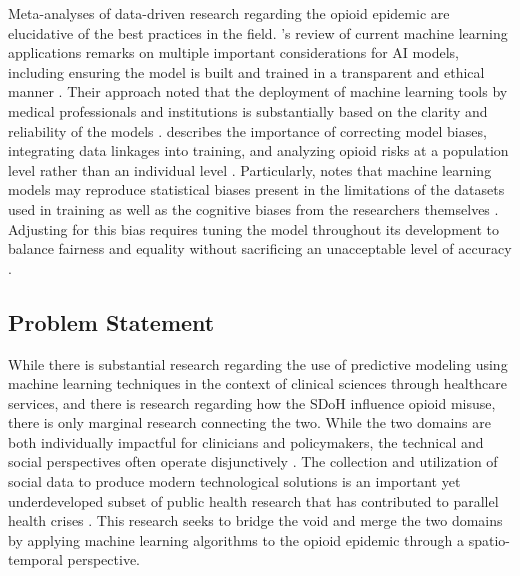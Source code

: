 \documentclass[journal]{IEEEtran}
\begin{document}
	Meta-analyses of data-driven research regarding the opioid epidemic are elucidative of the best practices in the field. \citeauthor{gabrielReviewLeveragingArtificial2025}'s review of current machine learning applications remarks on multiple important considerations for AI models, including ensuring the model is built and trained in a transparent and ethical manner \cite{gabrielReviewLeveragingArtificial2025}. Their approach noted that the deployment of machine learning tools by medical professionals and institutions is substantially based on the clarity and reliability of the models \cite{gabrielReviewLeveragingArtificial2025}. \citeauthor{bharatBigDataPredictive2021} describes the importance of correcting model biases, integrating data linkages into training, and analyzing opioid risks at a population level rather than an individual level  \cite{bharatBigDataPredictive2021}. Particularly, \citeauthor{bharatBigDataPredictive2021} notes that machine learning models may reproduce statistical biases present in the limitations of the datasets used in training as well as the cognitive biases from the researchers themselves \cite{bharatBigDataPredictive2021}. Adjusting for this bias requires tuning the model throughout its development to balance fairness and equality without sacrificing an unacceptable level of accuracy \cite{bharatBigDataPredictive2021}.

	\subsection{Problem Statement}

	While there is substantial research regarding the use of predictive modeling using machine learning techniques in the context of clinical sciences through healthcare services, and there is research regarding how the SDoH influence opioid misuse, there is only marginal research connecting the two. While the two domains are both individually impactful for clinicians and policymakers, the technical and social perspectives often operate disjunctively \cite{blancoAmericasOpioidCrisis2020}. The collection and utilization of social data to produce modern technological solutions is an important yet underdeveloped subset of public health research that has contributed to parallel health crises \cite{bharatBigDataPredictive2021, blancoAmericasOpioidCrisis2020, baduDataDrivenEpidemiologicalApproach2025}. This research seeks to bridge the void and merge the two domains by applying machine learning algorithms to the opioid epidemic through a spatio-temporal perspective.
\end{document}
